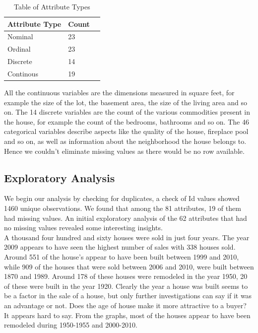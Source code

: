 \documentclass[fleqn,10pt]{SelfArx} %
\begin{document}
	\begin{table}[hbt]
		\caption{Table of Attribute Types}
		\centering
		\begin{tabular}{llr}
			\cmidrule(r){1-2}
			Attribute Type & Count \\
			\midrule
			Nominal & 23 \\
			Ordinal & 23 \\
			Discrete & 14 \\
			Continous & 19
		\end{tabular}
		\label{tab:label}
	\end{table}
	
	All the continuous variables are the dimensions measured in square feet, for example the size of the lot, the basement area, the size of the living area and so on. The 14 discrete variables are the count of the various commodities present in the house, for example the count of the bedrooms, bathrooms and so on. The 46 categorical variables describe aspects like the quality of the house, fireplace pool and so on, as well as information about the neighborhood the house belongs to. Hence we couldn't eliminate missing values as there would be no row available.\\
	
	\subsection{Exploratory Analysis}
	We begin our analysis by checking for duplicates, a check of Id values showed 1460 unique observations. We found that among the 81 attributes, 19 of them had missing values. An initial exploratory analysis of the 62 attributes that had no missing values revealed some interesting insights. \\
	
	A thousand four hundred and sixty houses were sold in just four years. The year 2009 appears to have seen the highest number of sales with 338 houses sold. Around 551 of the house's appear to have been built between 1999 and 2010, while 909 of the houses that were sold between 2006 and 2010,  were built between 1870 and 1989. Around 178 of these houses were remodeled in the year 1950, 20 of these were built in the year 1920. Clearly the year a house was built seems to be a factor in the sale of a house, but only further investigations can say if it was an advantage or not. Does the age of house make it more attractive to a buyer? It appears hard to say. From the graphs, most of the houses appear to have been remodeled during 1950-1955 and 2000-2010. \\
	
\end{document}
